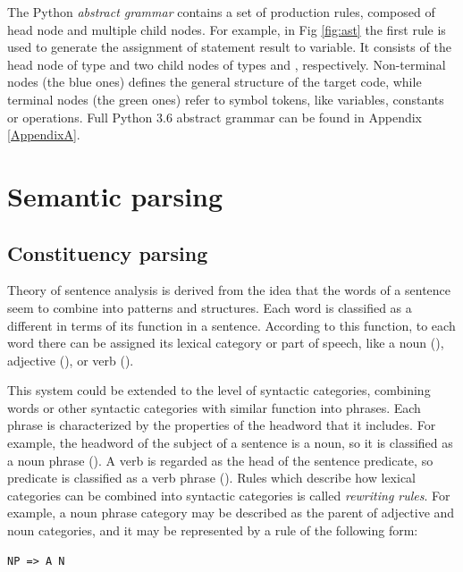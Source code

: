 The Python \emph{abstract grammar} contains a set of production rules, composed of head node and multiple child nodes. For example, in Fig \ref{fig:ast} the first rule is used to generate the assignment of statement result to variable. It consists of the head node of type  and two child nodes of types  and , respectively. Non-terminal nodes (the blue ones) defines the general structure of the target code, while terminal nodes (the green ones) refer to symbol tokens, like variables, constants or operations. Full Python 3.6 abstract grammar can be found in Appendix \ref{AppendixA}. 

\section{Semantic parsing}
\subsection{Constituency parsing}
Theory of sentence analysis is derived from the idea that the words of a sentence seem to combine into patterns and structures. Each word is classified as a different in terms of its function in a sentence. According to this function, to each word there can be assigned its lexical category or part of speech, like a noun (), adjective (), or verb (). 

This system could be extended to the level of syntactic categories, combining words or other syntactic categories with similar function into phrases. Each phrase is characterized by the properties of the headword that it includes. For example, the headword of the subject of a sentence is a noun, so it is classified as a noun phrase (). A verb is regarded as the head of the sentence predicate, so predicate is classified as a verb phrase (). Rules which describe how lexical categories can be combined into syntactic categories is called \emph{rewriting rules}. For example, a noun phrase category may be described as the parent of adjective and noun categories, and it may be represented by a rule of the following form:

\begin{verbatim}
NP => A N
\end{verbatim}

